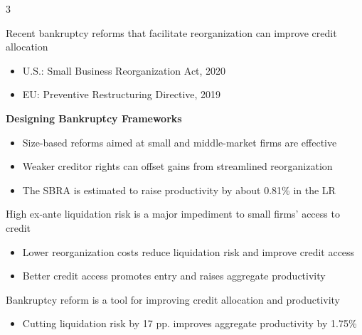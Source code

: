 \documentclass[10pt]{article}
\begin{document}
\begin{multicols}{3}
\begin{tcolorbox}[title= Efficient Policy Design]
Recent bankruptcy reforms that facilitate reorganization can improve credit allocation
\begin{itemize}
    \item U.S.: Small Business Reorganization Act, 2020
    \item EU: Preventive Restructuring Directive, 2019
\end{itemize}

\textbf{Designing Bankruptcy Frameworks}
\begin{itemize}
    \item Size-based reforms aimed at small and middle-market firms are effective
    \item Weaker creditor rights can offset gains from streamlined reorganization
    \item The SBRA is estimated to raise productivity by about 0.81\% in the LR
\end{itemize}
\end{tcolorbox}

\begin{tcolorbox}[title=Conclusions]
High ex-ante liquidation risk is a major impediment to small firms' access to credit
\begin{itemize}
    \item Lower reorganization costs reduce liquidation risk and improve credit access
    \item Better credit access promotes entry and raises aggregate productivity
\end{itemize}

\vspace{2mm}

Bankruptcy reform is a tool for improving credit allocation and productivity \begin{itemize}
    \item Cutting liquidation risk by 17 pp. improves aggregate productivity by 1.75\%
\end{itemize}

\end{tcolorbox}



\end{multicols}
\end{document}
